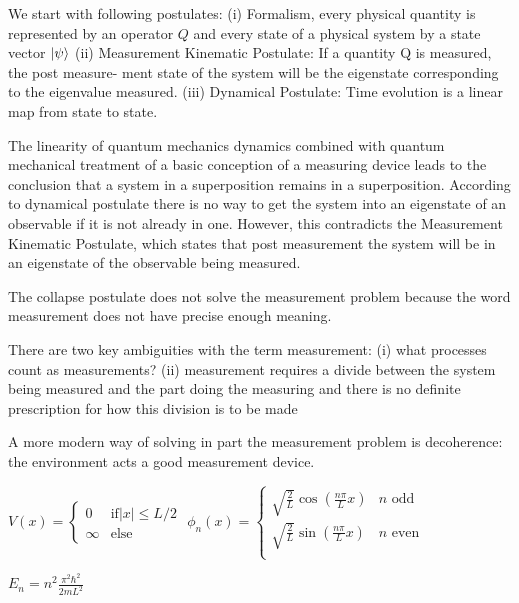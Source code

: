 \begin{squishlist}
    \item We start with following postulates: (i) Formalism, every physical quantity is represented by an operator $Q$ and every state of
    a physical system by a state vector $\ket{\psi}$ (ii) Measurement Kinematic Postulate: If a quantity Q is measured, the post measure-
    ment state of the system will be the eigenstate corresponding to the eigenvalue measured. (iii) Dynamical Postulate: Time evolution is a linear map from state to state.

    \item The linearity of quantum mechanics dynamics combined with quantum mechanical
    treatment of a basic conception of a measuring device leads to the conclusion that a system
    in a superposition remains in a superposition. According to dynamical postulate there is no
    way to get the system into an eigenstate of an observable if it is not already in one. However,
    this contradicts the Measurement Kinematic Postulate, which states that post measurement the
    system will be in an eigenstate of the observable being measured.

    \item The collapse postulate does not solve the measurement problem because the word measurement does not have precise enough meaning.
    \item There are two key ambiguities with the term measurement: (i) what processes count as measurements? (ii) measurement requires a divide between the system being measured and the part doing
    the measuring and there is no definite prescription for how this division is to be made

    \item A more modern way of solving in part the measurement problem is decoherence: the environment acts a good measurement device.
\end{squishlist}
\columnbreak

\begin{squishlist}
    
    \item $V(x) = \begin{cases}
        0 & \text{if} |x| \leq L/2 \\ \infty & \text{else}
    \end{cases}$
    \qquad
    $\phi_n(x) = \begin{cases}
        \sqrt{\frac{2}{L}} \cos(\frac{n\pi }{L} x) & n \text{ odd} \\
        \sqrt{\frac{2}{L}} \sin(\frac{n\pi }{L} x) & n \text{ even} \\
    \end{cases}$
    
    \item $E_n = n^2 \frac{\pi^2 \hbar^2}{2 m L^2}$
\end{squishlist}

